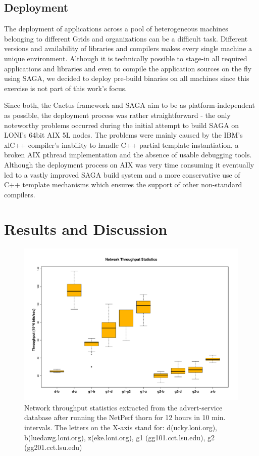 \documentclass[conference,final]{IEEEtran}
\begin{document}
\subsection{Deployment}
The deployment of applications across a pool of heterogeneous machines belonging to different Grids and organizations can be a difficult task. Different versions and availability of libraries and compilers makes every single machine a unique environment. Although it is technically possible to stage-in all required applications and libraries and even to compile the application sources on the fly using SAGA, we decided to deploy pre-build binaries on all machines since this exercise is not part of this work's focus.

Since both, the Cactus framework and SAGA aim to be as platform-independent as possible, the deployment process was rather straightforward - the only noteworthy problems occurred during the initial attempt to build SAGA on LONI's 64bit AIX 5L nodes. The problems were mainly caused by the IBM's xlC++ compiler's inability to handle C++ partial template instantiation, a broken AIX pthread implementation and the absence of usable debugging tools. Although the deployment process on AIX was very time consuming it eventually led to a vastly improved SAGA build system and a more conservative use of C++ template mechanisms which ensures the support of other non-standard compilers.

\section{Results and Discussion}

\begin{figure}
\begin{center}
\includegraphics[scale=0.30]{./figures/figure_04}
\end{center}
\caption{Network throughput statistics extracted from the advert-service database after running the NetPerf thorn for 12 hours in 10 min. intervals. The letters on the X-axis stand for: d(ucky.loni.org), b(luedawg.loni.org), z(eke.loni.org), g1 (gg101.cct.lsu.edu), g2 (gg201.cct.lsu.edu)}
\label{fig:boxplot}
\end{figure}
\end{document}
